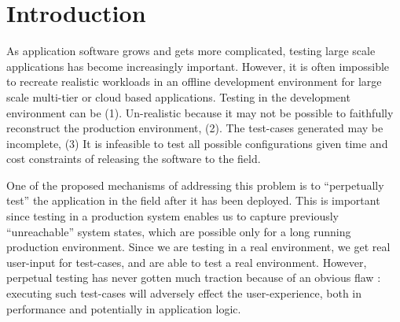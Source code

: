 
\section{Introduction}
\label{sec:intro}



As application software grows and gets more complicated, testing large scale applications has become increasingly important. 
However, it is often impossible to recreate realistic workloads in an offline development environment for large scale multi-tier or cloud based applications.
Testing in the development environment can be (1). Un-realistic because it may not be possible to faithfully reconstruct the production environment, (2). The test-cases generated may be incomplete, (3) It is infeasible to test all possible configurations given time and cost constraints of releasing the software to the field. 

One of the proposed mechanisms of addressing this problem is to ``perpetually test''\cite{perpetual} the application in the field after it has been deployed. 
This is important since testing in a production system enables us to capture previously ``unreachable'' system states, which are possible only for a long running production environment.
Since we are testing in a real environment, we get real user-input for test-cases, and are able to test a real environment.
However, perpetual testing has never gotten much traction because of an obvious flaw : executing such test-cases will adversely effect the user-experience, both in performance and potentially in application logic.

